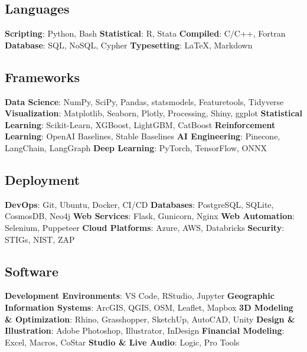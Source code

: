 \documentclass{article}
\begin{document}
    \subsection*{Languages}
        \textbf{Scripting}: Python, Bash\newline
        \textbf{Statistical}: R, Stata\newline
        \textbf{Compiled}: C/C++, Fortran\newline
        \textbf{Database}: SQL, NoSQL, Cypher\newline
        \textbf{Typesetting}: \LaTeX, Markdown
    \subsection*{Frameworks}
        \textbf{Data Science}: NumPy, SciPy, Pandas, statsmodels, Featuretools, Tidyverse\newline
        \textbf{Visualization}: Matplotlib, Seaborn, Plotly, Processing, Shiny, ggplot\newline
        \textbf{Statistical Learning}: Scikit-Learn, XGBoost, LightGBM, CatBoost\newline
        \textbf{Reinforcement Learning}: OpenAI Baselines, Stable Baselines\newline
        \textbf{AI Engineering}: Pinecone, LangChain, LangGraph\newline
        \textbf{Deep Learning}: PyTorch, TensorFlow, ONNX
    \subsection*{Deployment}
        \textbf{DevOps}: Git, Ubuntu, Docker, CI/CD\newline
        \textbf{Databases}: PostgreSQL, SQLite, CosmosDB, Neo4j\newline
        \textbf{Web Services}: Flask, Gunicorn, Nginx\newline
        \textbf{Web Automation}: Selenium, Puppeteer\newline
        \textbf{Cloud Platforms}: Azure, AWS, Databricks\newline
        \textbf{Security}: STIGs, NIST, ZAP
    \subsection*{Software}
        \textbf{Development Environments}: VS Code, RStudio, Jupyter\newline
        \textbf{Geographic Information Systems}: ArcGIS, QGIS, OSM, Leaflet, Mapbox\newline
        \textbf{3D Modeling \& Optimization}: Rhino, Grasshopper, SketchUp, AutoCAD, Unity\newline
        \textbf{Design \& Illustration}: Adobe Photoshop, Illustrator, InDesign\newline
        \textbf{Financial Modeling}: Excel, Macros, CoStar\newline
        \textbf{Studio \& Live Audio}: Logic, Pro Tools
\end{document}

